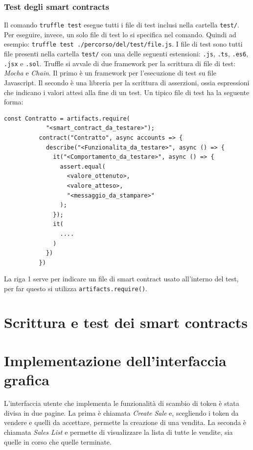 \documentclass[a4paper]{article}
\begin{document}
        \subsubsection{Test degli smart contracts}
        Il comando \verb|truffle test| esegue tutti i file di test inclusi nella cartella \verb|test/|. Per eseguire, invece, un solo file di test lo si specifica nel comando. Quindi ad esempio: \verb|truffle test ./percorso/del/test/file.js|.
        I file di test sono tutti file presenti nella cartella \verb|test/| con una delle seguenti estensioni: \verb|.js|, \verb|.ts|, \verb|.es6|, \verb|.jsx| e \verb|.sol|.
        \newline
        Truffle si avvale di due framework per la scrittura di file di test: \emph{Mocha} e \emph{Chain}\cite{truffleframeworks}. Il primo è un framework per l'esecuzione di test su file Javascript. Il secondo è una libreria per la scrittura di asserzioni,
        ossia espressioni che indicano i valori attesi alla fine di un test.
        \newline
        Un tipico file di test ha la seguente forma:
        \begin{lstlisting}[style=ES6, title={Esempio di file di test}]
          const Contratto = artifacts.require(
            "<smart_contract_da_testare>");
          contract("Contratto", async accounts => {
            describe("<Funzionalita_da_testare>", async () => {
              it("<Comportamento_da_testare>", async () => {
                assert.equal(
                  <valore_ottenuto>,
                  <valore_atteso>,
                  "<messaggio_da_stampare>"
                );
              });
              it(
                ....
              )
            })
          })\end{lstlisting}
        La riga 1 serve per indicare un file di smart contract usato all'interno del test, per far questo si utilizza \verb|artifacts.require()|.
        

        \section{Scrittura e test dei smart contracts}
        \newpage

        \section{Implementazione dell'interfaccia grafica}
        L'interfaccia utente che implementa le funzionalità di scambio di token è stata divisa in due pagine.
        La prima è chiamata \emph{Create Sale} e, scegliendo i token da vendere e quelli da accettare, permette
        la creazione di una vendita. La seconda è chiamata \emph{Sales List} e permette di visualizzare la lista di tutte le vendite, sia quelle in corso
        che quelle terminate.
\end{document}
